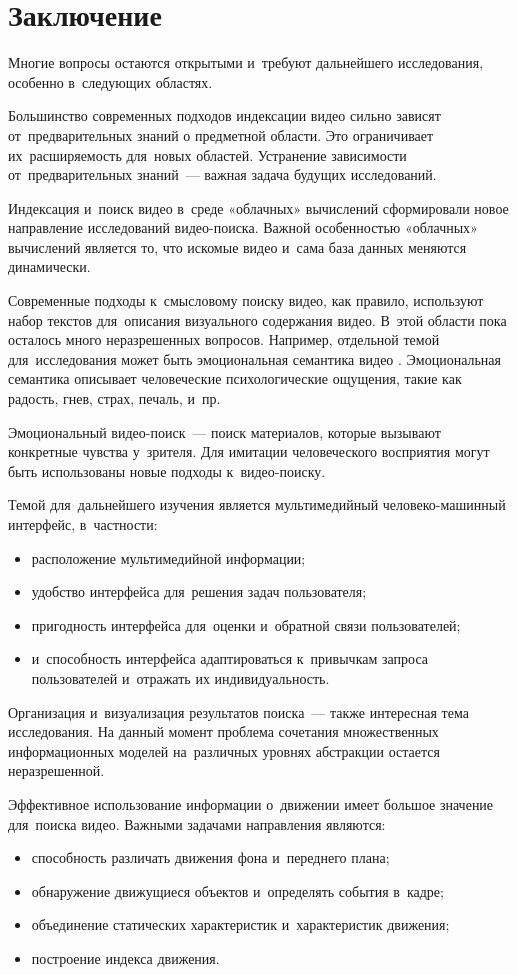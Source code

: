 
\section{Заключение}

Многие вопросы остаются открытыми и~требуют дальнейшего исследования,
особенно в~следующих областях.

Большинство современных подходов индексации видео
сильно зависят от~предварительных знаний о предметной области.
Это ограничивает их~расширяемость для~новых областей.
Устранение зависимости от~предварительных знаний~—
важная задача будущих исследований.

Индексация и~поиск видео в~среде «облачных» вычислений сформировали
новое направление исследований видео-поиска.
Важной особенностью «облачных» вычислений является то,
что искомые видео и~сама база данных меняются динамически.

Современные подходы к~смысловому поиску видео,
как правило, используют набор текстов для~описания визуального содержания видео.
В~этой области пока осталось много неразрешенных вопросов.
Например, отдельной темой для~исследования может быть
эмоциональная семантика видео \cite{Tamizharasan:2013}.
Эмоциональная семантика описывает
человеческие психологические ощущения,
такие как радость, гнев, страх, печаль, и~пр.

Эмоциональный видео-поиск~— поиск материалов,
которые вызывают конкретные чувства у~зрителя.
Для имитации человеческого восприятия могут быть использованы
новые подходы к~видео-поиску.

Темой для~дальнейшего изучения является
мультимедийный человеко-машинный интерфейс,
в~частности:
\begin{itemize}
    \item расположение мультимедийной информации;
    \item удобство интерфейса для~решения задач пользователя;
    \item пригодность интерфейса для~оценки и~обратной связи пользователей;
    \item и~способность интерфейса адаптироваться к~привычкам запроса пользователей
        и~отражать их индивидуальность.
\end{itemize}

Организация и~визуализация результатов поиска~— также
интересная тема исследования. На данный момент проблема
сочетания множественных информационных моделей
на~различных уровнях абстракции остается неразрешенной.

Эффективное использование информации о~движении имеет большое значение
для~поиска видео. Важными задачами направления являются:
\begin{itemize}
    \item способность различать движения фона и~переднего плана;
    \item обнаружение движущиеся объектов и~определять события в~кадре;
    \item объединение статических характеристик и~характеристик движения;
    \item построение индекса движения.
\end{itemize}

